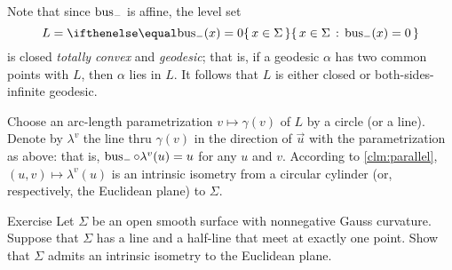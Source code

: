 Note that since $\mathop{\rm bus}\nolimits_-$ is affine, the level set 
\[L=\set{x\in\Sigma}{\bus_-(x)=0}\]
is closed \emph{totally convex} and {}\emph{geodesic};
that is, if a geodesic $\alpha$ has two common points with $L$, then $\alpha$ lies in $L$.
It follows that $L$ is either closed or both-sides-infinite geodesic.

Choose an arc-length parametrization $v\mapsto\gamma(v)$ of $L$ by a circle (or a line).
Denote by $\lambda^v$ the line thru $\gamma(v)$ in the direction of $\vec u$ with the parametrization as above: that is, $\mathop{\rm bus}\nolimits_-\circ\lambda^v(u)=u$ for any $u$ and $v$.
According to \ref{clm:parallel}, $(u,v)\mapsto \lambda^v(u)$ is an intrinsic isometry from a circular cylinder (or, respectively, the Euclidean plane) to $\Sigma$.
\qeds

\begin{thm}{Exercise}\label{ex:line+half-line}
Let $\Sigma$ be an open smooth surface with nonnegative Gauss curvature.
Suppose that $\Sigma$ has a line and a half-line that meet at exactly one point.
Show that $\Sigma$ admits an intrinsic isometry to the Euclidean plane.
\end{thm}

